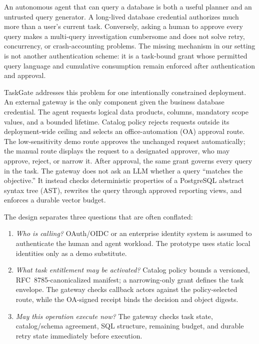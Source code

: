 \documentclass[10pt,journal,compsoc]{IEEEtran}
\providecommand{\IEEEPARstart}[2]{#1#2}
\newcommand{\system}{TaskGate\xspace}
\begin{document}
\IEEEPARstart{A}{n} autonomous agent that can query a database is both a useful
planner and an untrusted query generator.  A long-lived database credential
authorizes much more than a user's current task.  Conversely, asking a human to
approve every query makes a multi-query investigation cumbersome and does not
solve retry, concurrency, or crash-accounting problems.  The missing mechanism
in our setting is not another authentication scheme: it is a task-bound grant
whose permitted query language and cumulative consumption remain enforced
after authentication and approval.

\system addresses this problem for one intentionally constrained deployment.
An external gateway is the only component given the business database
credential.  The agent requests logical data products, columns, mandatory scope
values, and a bounded lifetime.  Catalog policy rejects requests outside its
deployment-wide ceiling and selects an office-automation (OA) approval route.
The low-sensitivity demo route approves the unchanged request automatically; the
manual route displays the request to a designated approver, who may approve,
reject, or narrow it.
After approval, the same grant governs every query in the task.  The gateway
does not ask an LLM whether a query ``matches the objective.''  It instead
checks deterministic properties of a PostgreSQL abstract syntax tree (AST),
rewrites the query through approved reporting views, and enforces a durable
vector budget.

The design separates three questions that are often conflated:

\begin{enumerate}
  \item \emph{Who is calling?}  OAuth/OIDC or an enterprise identity system is
  assumed to authenticate the human and agent workload.  The prototype uses
  static local identities only as a demo substitute.
  \item \emph{What task entitlement may be activated?}  Catalog policy bounds a
  versioned, RFC~8785-canonicalized manifest; a narrowing-only grant defines the
  task envelope.  The gateway checks callback actors against the policy-selected
  route, while the OA-signed receipt binds the decision and object digests.
  \item \emph{May this operation execute now?}  The gateway checks task state,
  catalog/schema agreement, SQL structure, remaining budget, and durable retry
  state immediately before execution.
\end{enumerate}
\end{document}
